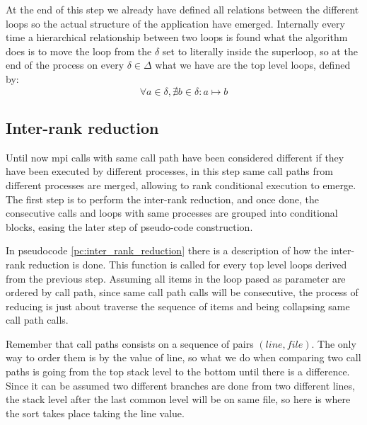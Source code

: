 At the end of this step we already have defined all relations between the
different loops so the actual structure of the application have emerged. 
Internally every time a hierarchical relationship between two loops is found
what the algorithm does is to move the loop from the $\delta$ set to literally
inside the superloop, so at the end of the process on every $\delta \in \Delta$
what we have are the top level loops, defined by:
\begin{equation}
    \label{eq:top_level_loops_de}
    \forall a \in \delta, \nexists b \in \delta: a \mapsto b
\end{equation}

\subsection{Inter-rank reduction}

Until now mpi calls with same call path have been considered different if they 
have been executed by different processes, in this step same call paths from 
different processes are merged, allowing to rank conditional execution to
emerge. The first step is to perform the inter-rank reduction, and once done,
the consecutive calls and loops with same processes are grouped into conditional
blocks, easing the later step of pseudo-code construction.

In pseudocode \ref{pc:inter_rank_reduction} there is a description of how the
inter-rank reduction is done. This function is called for every top level loops
derived from the previous step. Assuming all items in the loop pased as
parameter are ordered by call path, since same call path calls will be
consecutive, the process of reducing is just about traverse the sequence of
items and being collapsing same call path calls.

Remember that call paths consists on a sequence of pairs $(line, file)$. The
only way to order them is by the value of line, so what we do when comparing two
call paths is going from the top stack level to the bottom until there is 
a difference. Since it can be assumed two different branches are done from two 
different lines, the stack level after the last common level will be on same 
file, so here is where the sort takes place taking the line value.

